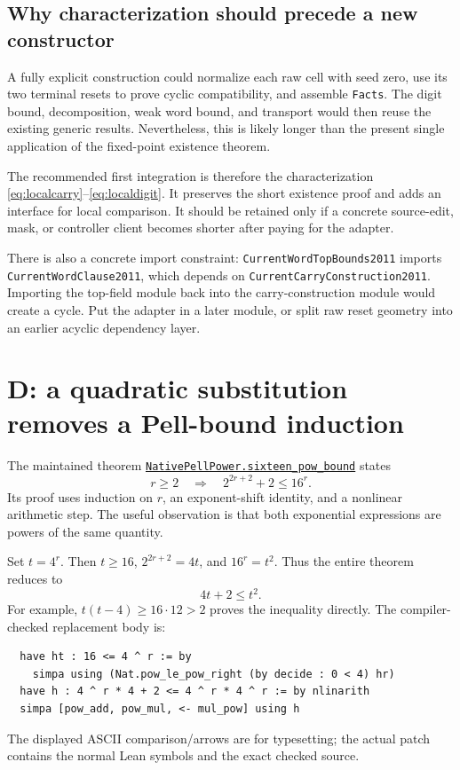 \documentclass[11pt]{article}
\newcommand{\code}[1]{\nolinkurl{#1}}
\newcommand{\src}[2]{\href{https://github.com/VladimirReshetnikov/ProveIt/blob/9f35798db4a63c25e435fca14d75931144657d7e/Computability/DiophantineConsistency/Lean/DiophantineConsistency/#1.lean}{\code{#1.#2}}}
\begin{document}
\subsection{Why characterization should precede a new constructor}
A fully explicit construction could normalize each raw cell with seed zero,
use its two terminal resets to prove cyclic compatibility, and assemble
\code{Facts}. The digit bound, decomposition, weak word bound, and transport
would then reuse the existing generic results. Nevertheless, this is likely
longer than the present single application of the fixed-point existence theorem.

The recommended first integration is therefore the characterization
\eqref{eq:localcarry}--\eqref{eq:localdigit}. It preserves the short existence
proof and adds an interface for local comparison. It should be retained only if
a concrete source-edit, mask, or controller client becomes shorter after paying
for the adapter.

There is also a concrete import constraint: \code{CurrentWordTopBounds2011}
imports \code{CurrentWordClause2011}, which depends on
\code{CurrentCarryConstruction2011}. Importing the top-field module back into
the carry-construction module would create a cycle. Put the adapter in a later
module, or split raw reset geometry into an earlier acyclic dependency layer.

\section{D: a quadratic substitution removes a Pell-bound induction}
The maintained theorem \src{NativePellPower}{sixteen_pow_bound} states
\[
 r\ge2\quad\Longrightarrow\quad 2^{2r+2}+2\le16^r.
\]
Its proof uses induction on \(r\), an exponent-shift identity, and a nonlinear
arithmetic step. The useful observation is that both exponential expressions
are powers of the same quantity.\cite{pellpower}

Set \(t=4^r\). Then \(t\ge16\),
\(2^{2r+2}=4t\), and \(16^r=t^2\). Thus the entire theorem reduces to
\[
 4t+2\le t^2.
\]
For example, \(t(t-4)\ge16\cdot12>2\) proves the inequality directly.
The compiler-checked replacement body is:
\begin{lstlisting}
  have ht : 16 <= 4 ^ r := by
    simpa using (Nat.pow_le_pow_right (by decide : 0 < 4) hr)
  have h : 4 ^ r * 4 + 2 <= 4 ^ r * 4 ^ r := by nlinarith
  simpa [pow_add, pow_mul, <- mul_pow] using h
\end{lstlisting}
The displayed ASCII comparison/arrows are for typesetting; the actual patch
contains the normal Lean symbols and the exact checked source.
\end{document}

